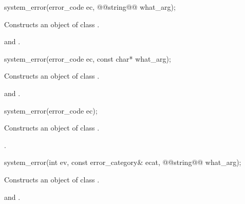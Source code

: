 \documentclass[ebook,11pt,article]{memoir}
\begin{document}
%
\begin{itemdecl}
system_error(error_code ec,  @@string@\removed{\&}@ what_arg);
\end{itemdecl}

\begin{itemdescr}
\pnum
\effects Constructs an object of class .

\pnum
\postconditions {} and
.
\end{itemdescr}

\begin{removedblock}
%
\begin{itemdecl}
system_error(error_code ec, const char* what_arg);
\end{itemdecl}

\begin{itemdescr}
\pnum
\effects Constructs an object of class .

\pnum
\postconditions {} and
.
\end{itemdescr}
\end{removedblock}

%
\begin{itemdecl}
system_error(error_code ec);
\end{itemdecl}

\begin{itemdescr}
\pnum
\effects Constructs an object of class .

\pnum
\postconditions {}.
\end{itemdescr}

%
\begin{itemdecl}
system_error(int ev, const error_category& ecat,  @@string@\removed{\&}@ what_arg);
\end{itemdecl}

\begin{itemdescr}
\pnum
\effects Constructs an object of class .

\pnum
\postconditions \raggedright {} and\linebreak
{}.
\end{itemdescr}
\end{document}
